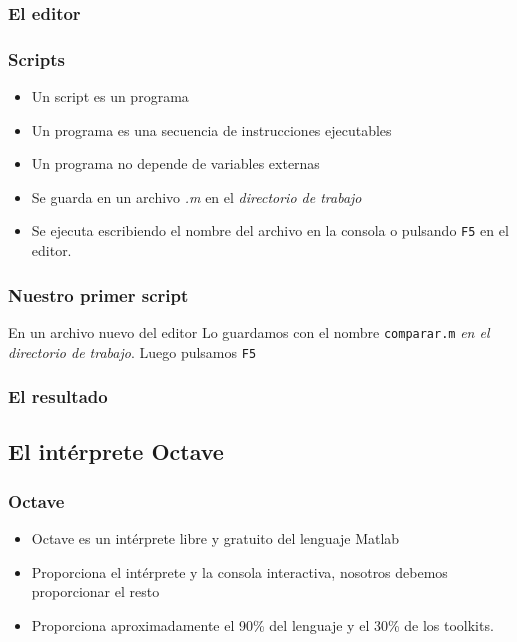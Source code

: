 \documentclass[12pt]{beamer}
\begin{document}
\begin{frame}
  \frametitle{El editor}
\end{frame}

\begin{frame}
\frametitle{Scripts}
\begin{itemize}
\item Un script es un programa
\item Un programa es una secuencia de instrucciones ejecutables
\item Un programa no depende de variables externas
\item Se guarda en un archivo \emph{.m} en el \emph{directorio
  de trabajo}
\item Se ejecuta escribiendo el nombre del archivo en la consola o
  pulsando \texttt{F5} en el editor.
\end{itemize}
\end{frame}



\begin{frame}
\frametitle{Nuestro primer script}
En un archivo nuevo del editor
\testcode
Lo guardamos con el nombre \texttt{comparar.m} \emph{en el directorio
  de trabajo}. Luego pulsamos \texttt{F5}
\end{frame}


\begin{frame}
\frametitle{El resultado}
  \begin{figure}[h]
    \centering{}
  \end{figure}
\end{frame}

\subsection{El intérprete Octave}
\begin{frame}
  \frametitle{Octave}
  \begin{itemize}
  \item Octave es un intérprete libre y gratuito del lenguaje Matlab
  \item Proporciona el intérprete y la consola interactiva, nosotros
    debemos proporcionar el resto
  \item Proporciona aproximadamente el 90\% del lenguaje y el 30\% de
    los toolkits.
  \end{itemize}
\end{frame}
\end{document}
